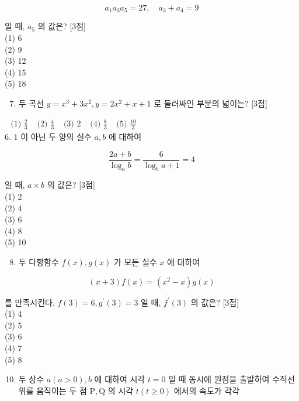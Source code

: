 \documentclass[10pt]{article}
\begin{document}
\[
a_{1} a_{3} a_{5}=27, \quad a_{3}+a_{4}=9
\]

일 때, \(a_{5}\) 의 값은? [3점]\\
(1) 6\\
(2) 9\\
(3) 12\\
(4) 15\\
(5) 18

\begin{enumerate}
  \setcounter{enumi}{6}
  \item 두 곡선 \(y=x^{3}+3 x^{2}, y=2 x^{2}+x+1\) 로 둘러싸인 부분의 넓이는? [3점]
\end{enumerate}

\(\begin{array}{lllll}\text { (1) } \frac{2}{3} & \text { (2) } \frac{4}{3} & \text { (3) } 2 & \text { (4) } \frac{8}{3} & \text { (5) } \frac{10}{3}\end{array}\)\\
6. 1 이 아닌 두 양의 실수 \(a, b\) 에 대하여

\[
\frac{2 a+b}{\log _{a} b}=\frac{6}{\log _{b} a+1}=4
\]

일 때, \(a \times b\) 의 값은? [3점]\\
(1) 2\\
(2) 4\\
(3) 6\\
(4) 8\\
(5) 10

\begin{enumerate}
  \setcounter{enumi}{7}
  \item 두 다항함수 \(f(x), g(x)\) 가 모든 실수 \(x\) 에 대하여
\end{enumerate}

\[
(x+3) f(x)=\left(x^{2}-x\right) g(x)
\]

를 만족시킨다. \(f(3)=6, g^{\prime}(3)=3\) 일 때, \(f^{\prime}(3)\) 의 값은? [3점]\\
(1) 4\\
(2) 5\\
(3) 6\\
(4) 7\\
(5) 8

\begin{enumerate}
  \setcounter{enumi}{9}
  \item 두 상수 \(a(a>0), b\) 에 대하여 시각 \(t=0\) 일 때 동시에 원점을 출발하여 수직선 위를 움직이는 두 점 \(\mathrm{P}, \mathrm{Q}\) 의 시각 \(t(t \geq 0)\) 에서의 속도가 각각
\end{enumerate}
\end{document}
